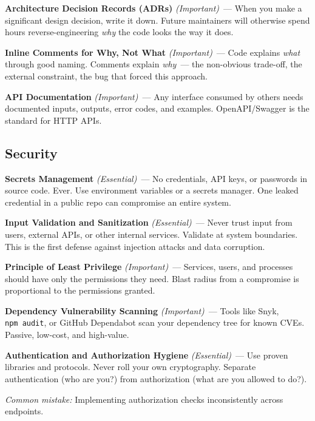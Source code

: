 \textbf{Architecture Decision Records (ADRs)} \emph{(Important)}~--- When you make a significant design decision, write it down. Future maintainers will otherwise spend hours reverse-engineering \emph{why} the code looks the way it does.

\textbf{Inline Comments for Why, Not What} \emph{(Important)}~--- Code explains \emph{what} through good naming. Comments explain \emph{why}~--- the non-obvious trade-off, the external constraint, the bug that forced this approach.

\textbf{API Documentation} \emph{(Important)}~--- Any interface consumed by others needs documented inputs, outputs, error codes, and examples. OpenAPI/Swagger is the standard for HTTP APIs.

\subsection*{Security}\label{writing-good-code:security}

\textbf{Secrets Management} \emph{(Essential)}~--- No credentials, API keys, or passwords in source code. Ever. Use environment variables or a secrets manager. One leaked credential in a public repo can compromise an entire system.

\textbf{Input Validation and Sanitization} \emph{(Essential)}~--- Never trust input from users, external APIs, or other internal services. Validate at system boundaries. This is the first defense against injection attacks and data corruption.

\textbf{Principle of Least Privilege} \emph{(Important)}~--- Services, users, and processes should have only the permissions they need. Blast radius from a compromise is proportional to the permissions granted.

\textbf{Dependency Vulnerability Scanning} \emph{(Important)}~--- Tools like Snyk, \texttt{npm\ audit}, or GitHub Dependabot scan your dependency tree for known CVEs. Passive, low-cost, and high-value.

\textbf{Authentication and Authorization Hygiene} \emph{(Essential)}~--- Use proven libraries and protocols. Never roll your own cryptography. Separate authentication (who are you?) from authorization (what are you allowed to do?).

\begin{notebox}

\emph{Common mistake:} Implementing authorization checks inconsistently across endpoints.

\end{notebox}

